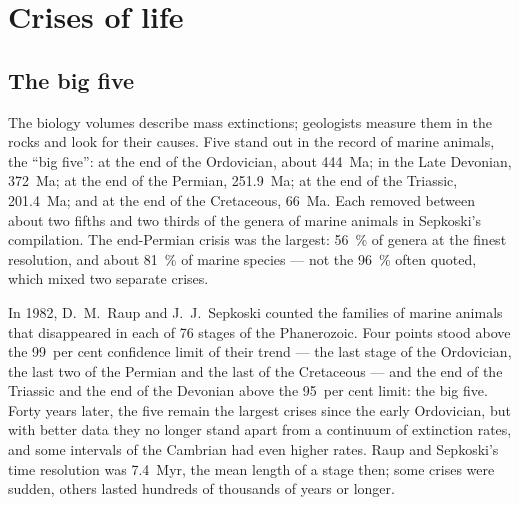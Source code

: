 \section{Crises of life}\label{sec:b2:phanerozoic-earth:extinctions}

\subsection*{The big five}

The biology volumes describe mass extinctions; geologists measure them in the rocks and look for
their causes. Five stand out in the record of marine animals, the ``big five'': at the end of the
Ordovician, about \qty{444}{Ma}; in the Late Devonian, \qty{372}{Ma}; at the end of the Permian,
\qty{251.9}{Ma}; at the end of the Triassic, \qty{201.4}{Ma}; and at the end of the Cretaceous,
\qty{66}{Ma}. Each removed between about two fifths and two thirds of the genera of marine
animals in Sepkoski's compilation. The end-Permian crisis was the largest: \qty{56}{\percent} of
genera at the finest resolution, and about \qty{81}{\percent} of marine species --- not the
\qty{96}{\percent} often quoted, which mixed two separate crises.

\begin{history}
In 1982, D.~M.~Raup and J.~J.~Sepkoski counted the families of marine animals that disappeared
in each of 76 stages of the Phanerozoic. Four points stood above the 99~per cent confidence limit
of their trend --- the last stage of the Ordovician, the last two of the Permian and the last of
the Cretaceous --- and the end of the Triassic and the end of the Devonian above the 95~per cent
limit: the big five. Forty years later, the five remain the largest crises since the early
Ordovician, but with better data they no longer stand apart from a continuum of extinction
rates, and some intervals of the Cambrian had even higher rates. Raup and Sepkoski's time
resolution was \qty{7.4}{Myr}, the mean length of a stage then; some crises were sudden, others
lasted hundreds of thousands of years or longer.
\end{history}

